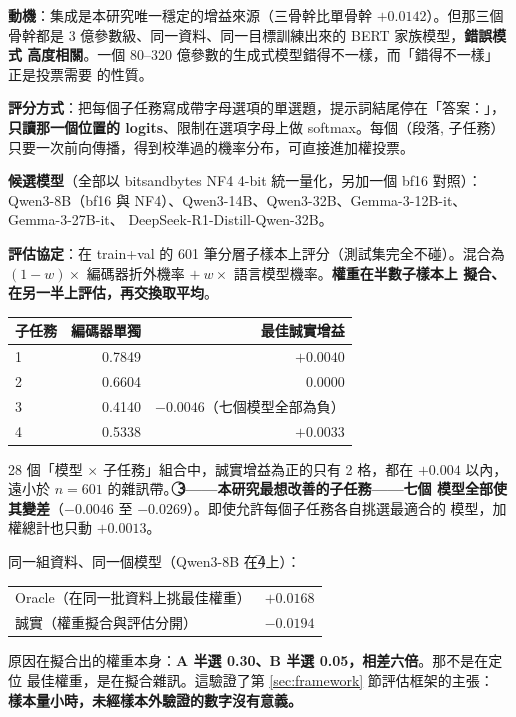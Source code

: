 \documentclass[11pt,a4paper]{ctexart}
\begin{document}
\textbf{動機}：集成是本研究唯一穩定的增益來源（三骨幹比單骨幹 $+0.0142$）。但那三個
骨幹都是 3 億參數級、同一資料、同一目標訓練出來的 BERT 家族模型，\textbf{錯誤模式
高度相關}。一個 80--320 億參數的生成式模型錯得不一樣，而「錯得不一樣」正是投票需要
的性質。

\textbf{評分方式}：把每個子任務寫成帶字母選項的單選題，提示詞結尾停在「答案：」，
\textbf{只讀那一個位置的 logits}、限制在選項字母上做 softmax。每個（段落, 子任務）
只要一次前向傳播，得到校準過的機率分布，可直接進加權投票。

\textbf{候選模型}（全部以 bitsandbytes NF4 4-bit 統一量化，另加一個 bf16 對照）：
Qwen3-8B（bf16 與 NF4）、Qwen3-14B、Qwen3-32B、Gemma-3-12B-it、Gemma-3-27B-it、
DeepSeek-R1-Distill-Qwen-32B。

\textbf{評估協定}：在 train+val 的 601 筆分層子樣本上評分（測試集完全不碰）。混合為
$(1-w)\times$ 編碼器折外機率 $+\ w\times$ 語言模型機率。\textbf{權重在半數子樣本上
擬合、在另一半上評估，再交換取平均}。

\begin{table}[h]
\centering\small
\begin{tabular}{@{}lrr@{}}
\toprule
子任務 & 編碼器單獨 & 最佳誠實增益 \\
\midrule
\textcircled{1} & 0.7849 & $+0.0040$ \\
\textcircled{2} & 0.6604 & $0.0000$ \\
\rowcolor{red!10}
\textcircled{3} & 0.4140 & $\mathbf{-0.0046}$（七個模型全部為負）\\
\textcircled{4} & 0.5338 & $+0.0033$ \\
\bottomrule
\end{tabular}
\end{table}

28 個「模型 $\times$ 子任務」組合中，誠實增益為正的只有 2 格，都在 $+0.004$ 以內，
遠小於 $n=601$ 的雜訊帶。\textbf{\textcircled{3}——本研究最想改善的子任務——七個
模型全部使其變差}（$-0.0046$ 至 $-0.0269$）。即使允許每個子任務各自挑選最適合的
模型，加權總計也只動 $+0.0013$。

\begin{tcolorbox}[colback=blue!5, colframe=blue!55, title=這個實驗的方法論價值大於其結果]
同一組資料、同一個模型（Qwen3-8B 在\textcircled{4}上）：

\medskip
\begin{tabular}{@{}lr@{}}
Oracle（在同一批資料上挑最佳權重） & $\mathbf{+0.0168}$ \\
誠實（權重擬合與評估分開） & $\mathbf{-0.0194}$ \\
\end{tabular}

\medskip
原因在擬合出的權重本身：\textbf{A 半選 0.30、B 半選 0.05，相差六倍}。那不是在定位
最佳權重，是在擬合雜訊。這驗證了第 \ref{sec:framework} 節評估框架的主張：
\textbf{樣本量小時，未經樣本外驗證的數字沒有意義。}
\end{tcolorbox}
\end{document}
